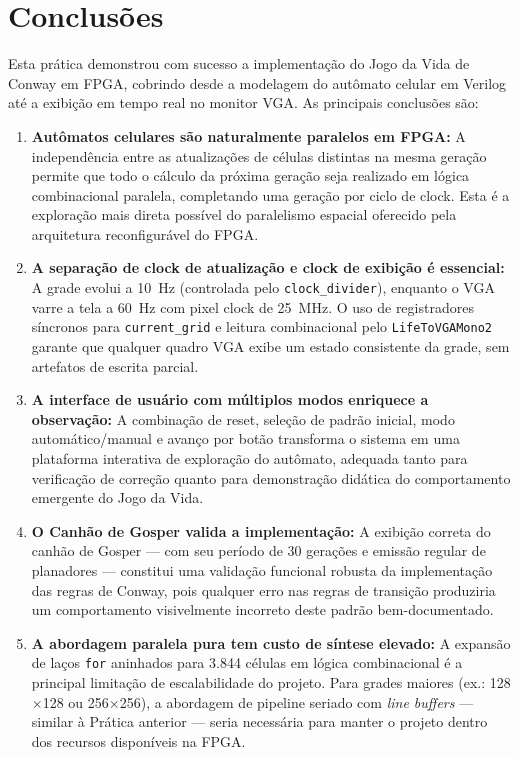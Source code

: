 \documentclass[12pt, a4paper]{article}
\begin{document}
	\section{Conclusões}
	
	Esta prática demonstrou com sucesso a implementação do Jogo da Vida de Conway em
	FPGA, cobrindo desde a modelagem do autômato celular em Verilog até a exibição
	em tempo real no monitor VGA. As principais conclusões são:
	
	\begin{enumerate}
		\item \textbf{Autômatos celulares são naturalmente paralelos em FPGA:} A
		independência entre as atualizações de células distintas na mesma geração
		permite que todo o cálculo da próxima geração seja realizado em lógica
		combinacional paralela, completando uma geração por ciclo de clock. Esta
		é a exploração mais direta possível do paralelismo espacial oferecido pela
		arquitetura reconfigurável do FPGA.
		
		\item \textbf{A separação de clock de atualização e clock de exibição é
			essencial:} A grade evolui a 10~Hz (controlada pelo \texttt{clock\_divider}),
		enquanto o VGA varre a tela a 60~Hz com pixel clock de 25~MHz. O uso de
		registradores síncronos para \texttt{current\_grid} e leitura combinacional
		pelo \texttt{LifeToVGAMono2} garante que qualquer quadro VGA exibe um estado
		consistente da grade, sem artefatos de escrita parcial.
		
		\item \textbf{A interface de usuário com múltiplos modos enriquece a
			observação:} A combinação de reset, seleção de padrão inicial, modo
		automático/manual e avanço por botão transforma o sistema em uma plataforma
		interativa de exploração do autômato, adequada tanto para verificação de
		correção quanto para demonstração didática do comportamento emergente do
		Jogo da Vida.
		
		\item \textbf{O Canhão de Gosper valida a implementação:} A exibição correta
		do canhão de Gosper --- com seu período de 30 gerações e emissão regular de
		planadores --- constitui uma validação funcional robusta da implementação das
		regras de Conway, pois qualquer erro nas regras de transição produziria um
		comportamento visivelmente incorreto deste padrão bem-documentado.
		
		\item \textbf{A abordagem paralela pura tem custo de síntese elevado:} A
		expansão de laços \texttt{for} aninhados para 3.844 células em lógica
		combinacional é a principal limitação de escalabilidade do projeto. Para
		grades maiores (ex.: 128$\times$128 ou 256$\times$256), a abordagem de
		pipeline seriado com \textit{line buffers} --- similar à Prática anterior
		--- seria necessária para manter o projeto dentro dos recursos disponíveis
		na FPGA.
	\end{enumerate}
	
\end{document}

